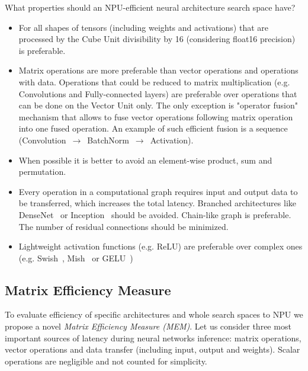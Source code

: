 \documentclass[letterpaper]{article}
\begin{document}
What properties should an NPU-efficient neural architecture search space have?
\begin{itemize}
\item For all shapes of tensors (including weights and activations) that are processed by the Cube Unit divisibility by 16 (considering float16 precision) is preferable.
\item Matrix operations are more preferable than vector operations and operations with data.
Operations that could be reduced to matrix multiplication (e.g. Convolutions and Fully-connected layers) are preferable over operations that can be done on the Vector Unit only.
The only exception is "operator fusion" mechanism that allows to fuse vector operations following matrix operation into one fused operation. An example of such efficient fusion is a sequence (Convolution~${\rightarrow}$~BatchNorm~${\rightarrow}$~Activation).

\item When possible it is better to avoid an element-wise product, sum and permutation.

\item Every operation in a computational graph requires input and output data to be transferred, which increases the total latency.
Branched architectures like DenseNet~\cite{huang2018densely} or Inception~\cite{szegedy2014going} should be avoided.
Chain-like graph is preferable. The number of residual connections should be minimized.
\item Lightweight activation functions (e.g. ReLU) are preferable over complex ones (e.g. Swish~\cite{ramachandran2017searching}, Mish~\cite{misra2020mish} or GELU~\cite{hendrycks2020gaussian})
\end{itemize}

\subsection{Matrix Efficiency Measure}

To evaluate efficiency of specific architectures and whole search spaces to NPU we propose a novel \textit{Matrix Efficiency Measure (MEM)}.
Let us consider three most important sources of latency during neural networks inference: matrix operations, vector operations and data transfer (including input, output and weights).
Scalar operations are negligible and not counted for simplicity.
\end{document}
